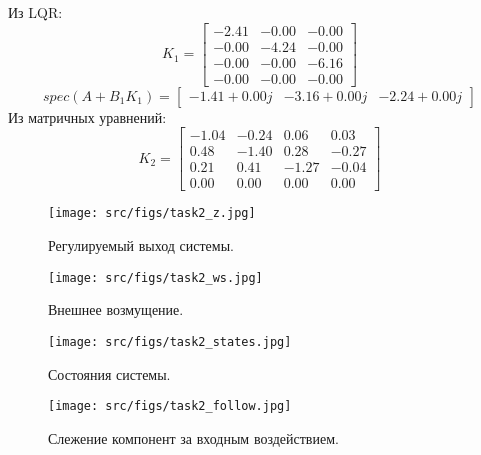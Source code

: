 Из LQR:
\[K_1 = \begin{bmatrix}
  -2.41 &  -0.00 &  -0.00\\
   -0.00 & -4.24 &  -0.00\\
   -0.00 &  -0.00 & -6.16\\
   -0.00 &  -0.00 &  -0.00
 \end{bmatrix}\]
 \[spec(A + B_1 K_1) = \begin{bmatrix}
  -1.41 + 0.00j & -3.16 + 0.00j & -2.24 + 0.00j
 \end{bmatrix}\]
Из матричных уравнений:
 \[K_2 = \begin{bmatrix}
  -1.04 & -0.24 &  0.06 &  0.03\\
   0.48 & -1.40 &  0.28 & -0.27\\
   0.21 &  0.41 & -1.27 & -0.04\\
   0.00 &  0.00 &  0.00 &  0.00
 \end{bmatrix}\]


\begin{figure}[ht!]
  \centering
  \texttt{[image: src/figs/task2\_z.jpg]}
  \caption{Регулируемый выход системы.}
  \label{fig:task2_z}
\end{figure}

\begin{figure}[ht!]
  \centering
  \texttt{[image: src/figs/task2\_ws.jpg]}
  \caption{Внешнее возмущение.}
  \label{fig:task2_ws}
\end{figure}

\begin{figure}[ht!]
  \centering
  \texttt{[image: src/figs/task2\_states.jpg]}
  \caption{Состояния системы.}
  \label{fig:task2_states}
\end{figure}

\begin{figure}[ht!]
  \centering
  \texttt{[image: src/figs/task2\_follow.jpg]}
  \caption{Слежение компонент за входным воздействием.}
  \label{fig:task2_follow}
\end{figure}

\FloatBarrier